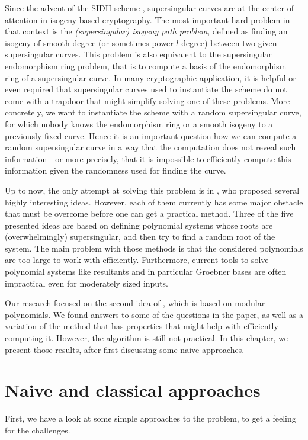Since the advent of the SIDH scheme \cite{sidh}, supersingular curves are at the center of attention in isogeny-based cryptography.
The most important hard problem in that context is the \emph{(supersingular) isogeny path problem}, defined as finding an isogeny of smooth degree (or sometimes power-$l$ degree) between two given supersingular curves.
This problem is also equivalent \cite{endomorphism_ring_reductions} to the supersingular endomorphism ring problem, that is to compute a basis of the endomorphism ring of a supersingular curve.
In many cryptographic application, it is helpful or even required that supersingular curves used to instantiate the scheme do not come with a trapdoor that might simplify solving one of these problems.
More concretely, we want to instantiate the scheme with a random supersingular curve, for which nobody knows the endomorphism ring or a smooth isogeny to a previously fixed curve.
Hence it is an important question how we can compute a random supersingular curve in a way that the computation does not reveal such information - or more precisely, that it is impossible to efficiently compute this information given the randomness used for finding the curve. 

Up to now, the only attempt at solving this problem is in \cite{base_paper}, who proposed several highly interesting ideas.
However, each of them currently has some major obstacle that must be overcome before one can get a practical method.
Three of the five presented ideas are based on defining polynomial systems whose roots are (overwhelmingly) supersingular, and then try to find a random root of the system.
The main problem with those methods is that the considered polynomials are too large to work with efficiently.
Furthermore, current tools to solve polynomial systems like resultants and in particular Groebner bases are often impractical even for moderately sized inputs.

Our research focused on the second idea of \cite{base_paper}, which is based on modular polynomials.
We found answers to some of the questions in the paper, as well as a variation of the method that has properties that might help with efficiently computing it.
However, the algorithm is still not practical.
In this chapter, we present those results, after first discussing some naive approaches.

\section{Naive and classical approaches}
\label{prop:naive_classical_approaches}
First, we have a look at some simple approaches to the problem, to get a feeling for the challenges.

